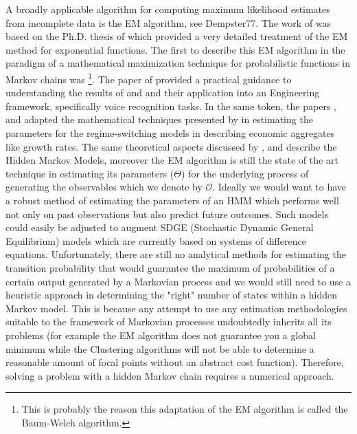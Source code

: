 \documentclass[a4paper,12pt]{article}
\theoremstyle{definition}
\begin{document}
A broadly applicable algorithm for computing maximum likelihood estimates from incomplete data is the EM algorithm, see {Dempster77}. The work of \cite{Dempster77} was based on the Ph.D. thesis of \cite{sundberg1972maximum} which provided a very detailed treatment of the EM method for exponential functions. 
 The first to describe this EM algorithm in the paradigm of a mathematical maximization technique for probabilistic functions in Markov chains was \cite{baum1970maximization}\footnote{This is probably the reason this adaptation of the EM algorithm is called the Baum-Welch algorithm.}. The paper of \citep{Rabiner89} provided a practical guidance to understanding the results of \citep{baum66} and \citep{baum1970maximization} and their application into an Engineering framework, specifically voice recognition tasks. In the same token, the papers \citep{hamilton2016macroeconomic}, \citep{hamilton02} and \citep{hamilton05} adapted the mathematical techniques presented by \citep{baum1970maximization} in estimating the parameters for the regime-switching models in describing economic aggregates like growth rates. 
 The same theoretical aspects discussed by \cite{Dempster77}, \cite{Rabiner89} and \cite{baum1967} describe the Hidden Markov Models, moreover the EM algorithm is still the state of the art technique in estimating its parameters ($\Theta$) for the  underlying process of generating the observables which we denote by $\mathcal{O}$. Ideally we would want to have a robust method of estimating the parameters of an HMM which performs well not only on past observations but also predict future outcomes. Such models could easily be adjusted to augment  SDGE (Stochastic Dynamic General Equilibrium) models which are currently based on systems of difference equations. Unfortunately, there are still no analytical methods for estimating the transition probability that would guarantee the maximum of probabilities of a certain output generated by a Markovian process and we would still need to use a heuristic approach in determining the "right" number of states within a hidden Markov model. This is because any attempt to use any estimation methodologies suitable to the framework of Markovian processes undoubtedly inherits all its problems (for example the EM algorithm does not guarantee you a global minimum while the Clustering algorithms will not be able to determine a reasonable amount of focal points without an abstract cost function). Therefore, solving a problem with a hidden Markov chain requires a numerical approach.  
\end{document}

